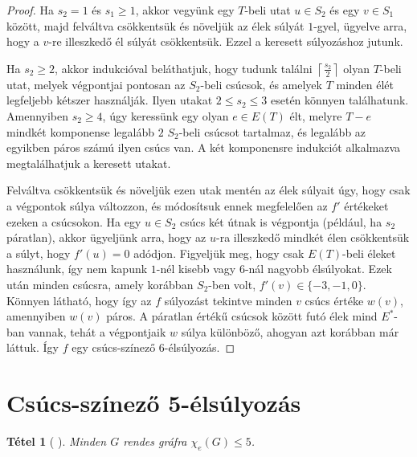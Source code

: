 \documentclass[12pt, a4paper]{report}
\newtheorem{tét}{Tétel}[section]
\theoremstyle{remark}
\theoremstyle{definition}
\begin{document}
\begin{proof}
Ha $s_2 = 1$ és $s_1 \geq 1$, akkor vegyünk egy $T$-beli utat $u \in S_2$ és egy $v \in S_1$ között, majd felváltva csökkentsük és növeljük az élek súlyát $1$-gyel, ügyelve arra, hogy a $v$-re illeszkedő él súlyát csökkentsük. Ezzel a keresett súlyozáshoz jutunk.

Ha $s_2 \geq 2$, akkor indukcióval beláthatjuk, hogy tudunk találni $\left\lceil \frac{s_2}{2} \right\rceil$ olyan $T$-beli utat, melyek végpontjai pontosan az $S_2$-beli csúcsok, és amelyek $T$ minden élét legfeljebb kétszer használják. Ilyen utakat $2 \leq s_2 \leq 3$ esetén könnyen találhatunk. Amennyiben $s_2 \geq 4$, úgy keressünk egy olyan $e \in E(T)$ élt, melyre $T-e$ mindkét komponense legalább $2$ $S_2$-beli csúcsot tartalmaz, és legalább az egyikben páros számú ilyen csúcs van. A két komponensre indukciót alkalmazva megtalálhatjuk a keresett utakat.

Felváltva csökkentsük és növeljük ezen utak mentén az élek súlyait úgy, hogy csak a végpontok súlya változzon, és módosítsuk ennek megfelelően az $f'$ értékeket ezeken a csúcsokon. Ha egy $u \in S_2$ csúcs két útnak is végpontja (például, ha $s_2$ páratlan), akkor ügyeljünk arra, hogy az $u$-ra illeszkedő mindkét élen csökkentsük a súlyt, hogy $f'(u) = 0$ adódjon. Figyeljük meg, hogy csak $E(T)$-beli éleket használunk, így nem kapunk $1$-nél kisebb vagy $6$-nál nagyobb élsúlyokat. Ezek után minden csúcsra, amely korábban $S_2$-ben volt, $f'(v) \in \lbrace -3, -1, 0 \rbrace$. Könnyen látható, hogy így az $f$ súlyozást tekintve minden $v$ csúcs értéke $w(v)$, amennyiben $w(v)$ páros. A páratlan értékű csúcsok között futó élek mind $E^*$-ban vannak, tehát a végpontjaik $w$ súlya különböző, ahogyan azt korábban már láttuk. Így $f$ egy csúcs-színező $6$-élsúlyozás.
\end{proof}

\section{Csúcs-színező 5-élsúlyozás}
\begin{tét}[\citeauthor{Kalkowski2010} \cite{Kalkowski2010}]
Minden $G$ rendes gráfra $\chi_e(G) \leq 5$.
\end{tét}
\end{document}
